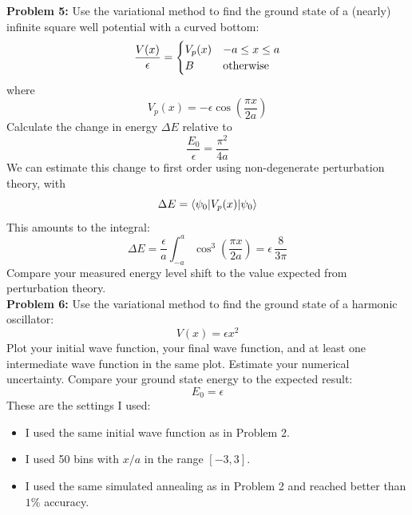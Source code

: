 \documentclass[12pt]{article}
\begin{document}
\noindent
{\bf Problem 5:}  Use the variational method to find the ground state of a (nearly) infinite square well potential with a curved bottom:
$$\frac{V(x)}{\epsilon} = \begin{cases}
V_p(x) & -a \leq x \leq a \\
B     & {\rm otherwise} \\
\end{cases}
$$
where
$$V_p(x) = -\epsilon \cos\left(\frac{\pi x}{2 a}\right)$$
Calculate the change in energy $\Delta E$ relative to 
$$\frac{E_0}{\epsilon} = \frac{\pi^2}{4a} $$
We can estimate this change to first order using non-degenerate perturbation theory, with
$$\Delta E = \braket{\psi_0| V_p(x) | \psi_0}$$
This amounts to the integral:
$$\Delta E = \frac{\epsilon}{a} \int_{-a}^{a} \cos^3\left(\frac{\pi x}{2 a}\right) = \epsilon \, \frac{8}{3 \pi}$$
Compare your measured energy level shift to the value expected from perturbation theory.\\

\noindent
{\bf Problem 6:}  Use the variational method to find the ground state of a harmonic oscillator:
$$V(x) = \epsilon x^2$$
Plot your initial wave function, your final wave function, and at least one intermediate wave function in the same plot. Estimate your numerical uncertainty.  Compare your ground state energy to the expected result:
$$E_0 = \epsilon$$
These are the settings I used:
\begin{itemize}
\item I used the same initial wave function as in Problem 2.
\item I used 50 bins with $x/a$ in the range $[-3, 3]$.
\item I used the same simulated annealing as in Problem 2 and reached better than $1\%$ accuracy.
\end{itemize}
\end{document}

